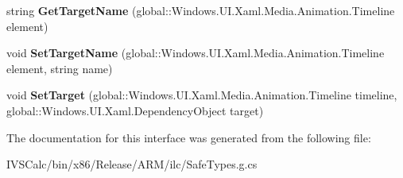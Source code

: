 \begin{DoxyCompactItemize}
\item 
\mbox{\label{interface_windows_1_1_u_i_1_1_xaml_1_1_media_1_1_animation_1_1_i_storyboard_statics_afeb68a7d3fc61bb8fdbba68aab2f0d4f}} 
string {\bfseries Get\+Target\+Name} (global\+::\+Windows.\+U\+I.\+Xaml.\+Media.\+Animation.\+Timeline element)
\item 
\mbox{\label{interface_windows_1_1_u_i_1_1_xaml_1_1_media_1_1_animation_1_1_i_storyboard_statics_ad1745f5d472fa822ee6f34d92a55ae55}} 
void {\bfseries Set\+Target\+Name} (global\+::\+Windows.\+U\+I.\+Xaml.\+Media.\+Animation.\+Timeline element, string name)
\item 
\mbox{\label{interface_windows_1_1_u_i_1_1_xaml_1_1_media_1_1_animation_1_1_i_storyboard_statics_ab3c5f3b6891c82842a641da8d1254fdc}} 
void {\bfseries Set\+Target} (global\+::\+Windows.\+U\+I.\+Xaml.\+Media.\+Animation.\+Timeline timeline, global\+::\+Windows.\+U\+I.\+Xaml.\+Dependency\+Object target)
\end{DoxyCompactItemize}


The documentation for this interface was generated from the following file\+:\begin{DoxyCompactItemize}
\item 
I\+V\+S\+Calc/bin/x86/\+Release/\+A\+R\+M/ilc/Safe\+Types.\+g.\+cs\end{DoxyCompactItemize}
